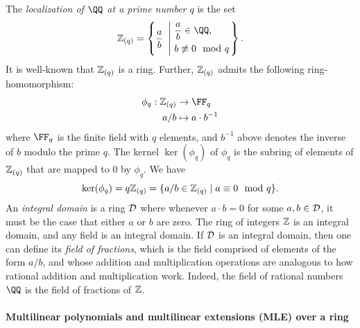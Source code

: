 \documentclass[11pt,letterpaper,usenames,dvipsnames]{article}
\begin{document}
The \emph{localization of $\QQ$ at a prime number $q$} is the set 
%
$$
\loc{q} = \left\{\frac{a}{b}\ \left| \ \begin{aligned}&\frac{a}{b}\in \QQ,\\  &b\not \equiv  0 \mod q \end{aligned}\right.\right\}.
$$
It is well-known that $\mathbb{Z}_{(q)}$ is a ring. Further, $\mathbb{Z}_{(q)}$ admits the following ring-homomorphism:
%
\begin{align*}
\phi_q: \loc{q} &\to \FF_q\\
a/b & \mapsto a \cdot b^{-1}
\end{align*}
where $\FF_q$ is the finite field with $q$ elements, and $b^{-1}$ above denotes the inverse of $b$ modulo the prime $q$. The kernel $\ker(\phi_q)$ of $\phi_q$ is the subring of elements of $\mathbb{Z}_{(q)}$ that are mapped to $0$ by $\phi_q$. We have
%
$$
\ker(\phi_q) = q\mathbb{Z}_{(q)} = \{a/b\in \mathbb{Z}_{(q)}\mid a\equiv 0 \mod q \}.
$$
%
An \emph{integral domain} is a ring $\mathcal{D}$ where whenever $a\cdot b=0$ for some $a,b\in \mathcal{D}$, it must be the case that either $a$ or $b$ are zero. The ring of integers $\mathbb{Z}$ is an integral domain, and any field is an integral domain. If $\mathcal{D}$ is an integral domain, then one can define its \emph{field of fractions}, which is the field comprised of elements of the form $a/b$, and whose addition and multiplication operations are analogous to how rational addition and multiplication work. Indeed, the field of rational numbers $\QQ$ is the field of fractions of $\mathbb{Z}$.

\paragraph{Multilinear polynomials and multilinear extensions (MLE) over a ring}
\label{sec:multilinear-extensions}
\end{document}
